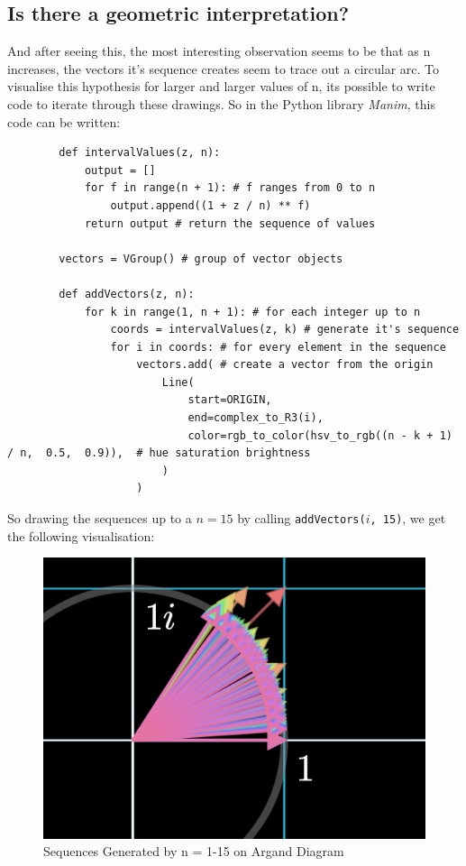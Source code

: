 \documentclass[11pt,a4paper]{article}
\begin{document}
\subsection{Is there a geometric interpretation?}
And after seeing this, the most interesting observation seems to be that as n increases,  the vectors it's sequence creates seem to trace out a circular arc. To visualise this hypothesis for larger and larger values of n, its possible to write code to iterate through these drawings. So in the Python library \textit{Manim}, this code can be written:

\begin{lstlisting}
        def intervalValues(z, n):
            output = []
            for f in range(n + 1): # f ranges from 0 to n
                output.append((1 + z / n) ** f) 
            return output # return the sequence of values

        vectors = VGroup() # group of vector objects

        def addVectors(z, n):
            for k in range(1, n + 1): # for each integer up to n
                coords = intervalValues(z, k) # generate it's sequence
                for i in coords: # for every element in the sequence
                    vectors.add( # create a vector from the origin
                        Line(
                            start=ORIGIN,
                            end=complex_to_R3(i),
                            color=rgb_to_color(hsv_to_rgb((n - k + 1) / n,  0.5,  0.9)),  # hue saturation brightness
                        )
                    )
\end{lstlisting}

So drawing the sequences up to a $n = 15$ by calling \texttt{addVectors($i$, 15)}, we get the following visualisation:

\begin{figure}[h]
\begin{center}
\includegraphics[scale=.37]{onefifteen} 
\caption{Sequences Generated by n = 1-15 on Argand Diagram}
\end{center}
\end{figure}
\end{document}
